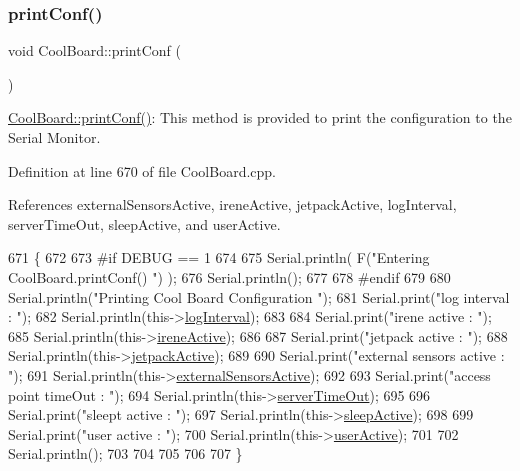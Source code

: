 \subsubsection{\texorpdfstring{print\+Conf()}{printConf()}}
{\footnotesize\ttfamily void Cool\+Board\+::print\+Conf (\begin{DoxyParamCaption}{ }\end{DoxyParamCaption})}

\hyperlink{classCoolBoard_a486507b8f0981d3cc671ed31c2145755}{Cool\+Board\+::print\+Conf()}\+: This method is provided to print the configuration to the Serial Monitor. 

Definition at line 670 of file Cool\+Board.\+cpp.



References external\+Sensors\+Active, irene\+Active, jetpack\+Active, log\+Interval, server\+Time\+Out, sleep\+Active, and user\+Active.


\begin{DoxyCode}
671 \{
672 
673 \textcolor{preprocessor}{#if DEBUG == 1}
674     
675     Serial.println( F(\textcolor{stringliteral}{"Entering CoolBoard.printConf() "}) );
676     Serial.println();
677 
678 \textcolor{preprocessor}{#endif}
679 
680     Serial.println(\textcolor{stringliteral}{"Printing Cool Board Configuration "});
681     Serial.print(\textcolor{stringliteral}{"log interval      : "});
682     Serial.println(this->\hyperlink{classCoolBoard_a84bc94413b64973e4aba8c467c97006c}{logInterval});
683 
684     Serial.print(\textcolor{stringliteral}{"irene active      : "});
685     Serial.println(this->\hyperlink{classCoolBoard_a9c3f7ac625481ee2ae802a25d97a4ae0}{ireneActive});
686 
687     Serial.print(\textcolor{stringliteral}{"jetpack active        : "});
688     Serial.println(this->\hyperlink{classCoolBoard_a9be03a913d26e558328935ca3b59a75e}{jetpackActive});
689 
690     Serial.print(\textcolor{stringliteral}{"external sensors active   : "});
691     Serial.println(this->\hyperlink{classCoolBoard_a638b00b76aeb819ecfd4c10b8cdd7bb7}{externalSensorsActive});
692 
693     Serial.print(\textcolor{stringliteral}{"access point timeOut  : "});
694     Serial.println(this->\hyperlink{classCoolBoard_a7a8d8d3d316220cdd049cd63c1aa8fe6}{serverTimeOut});
695 
696     Serial.print(\textcolor{stringliteral}{"sleept active         : "});
697     Serial.println(this->\hyperlink{classCoolBoard_a0a51b2287139f66c738101fb53139230}{sleepActive});
698 
699     Serial.print(\textcolor{stringliteral}{"user active       : "});
700     Serial.println(this->\hyperlink{classCoolBoard_a6395459131d6889a3005f79c7a35e964}{userActive});
701 
702     Serial.println();
703 
704 
705 
706 
707 \}
\end{DoxyCode}
\mbox{\label{classCoolBoard_ad03abdce2e65f520bbf2cff0f2d083cf}} 
